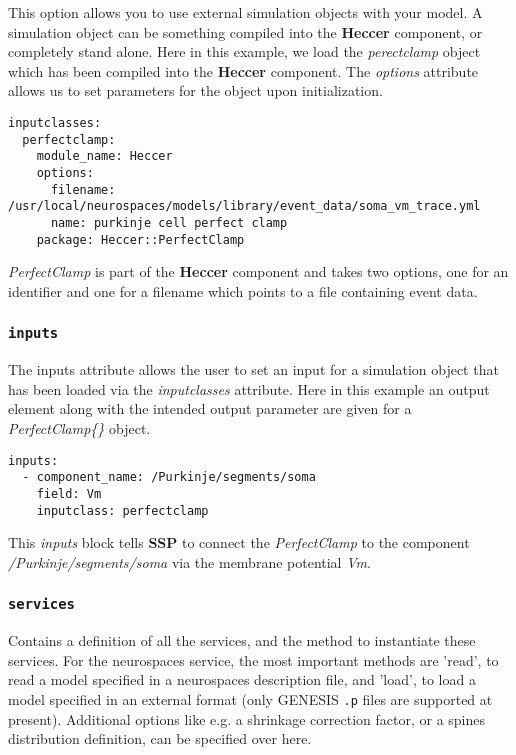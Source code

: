 \documentclass[12pt]{article}
\begin{document}
This option allows you to use external simulation objects with your model. A simulation object can be something compiled into the {\bf Heccer} component, or completely stand alone. Here in this example, we load the {\it perectclamp} object which has been compiled into the {\bf Heccer} component. The {\it options} attribute allows us to set parameters for the object upon initialization. 

\begin{verbatim}
inputclasses:
  perfectclamp:
    module_name: Heccer
    options:
      filename: /usr/local/neurospaces/models/library/event_data/soma_vm_trace.yml
      name: purkinje cell perfect clamp
    package: Heccer::PerfectClamp
\end{verbatim}

{\it PerfectClamp} is part of the {\bf Heccer} component and takes two options, one for an identifier and one for a filename which points to a file containing event data.

\subsubsection*{\tt inputs}

The inputs attribute allows the user to set an input for a simulation object that has been loaded via the {\it inputclasses} attribute. Here in this example an output element along with the intended output parameter are given for a {\it PerfectClamp\{\}} object.

\begin{verbatim}
inputs:
  - component_name: /Purkinje/segments/soma
    field: Vm
    inputclass: perfectclamp
\end{verbatim}

This {\it inputs} block tells {\bf SSP} to connect the {\it PerfectClamp} to the component {\it /Purkinje/segments/soma}
 via the membrane potential {\it Vm}.

\subsubsection*{\tt services}

    Contains a definition of all the services, and the method to instantiate these services. For the neurospaces service, the most important methods are 'read', to read a model specified in a neurospaces description file, and 'load', to load a model specified in an external format (only GENESIS {\tt .p} files are supported at present). Additional options like e.g. a shrinkage correction factor, or a spines distribution definition, can be specified over here. 
\end{document}
